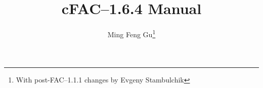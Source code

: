 \documentclass[twoside,a4paper]{refrep}
\newcommand{\cFAC}{{cFAC}\xspace}
\newcommand{\facversion}{{1.6.4}\xspace}
\newcounter{faq}[section]
\newcommand{\+}{\discretionary{\mbox{\scriptsize$\hookleftarrow$}}{}{}}
\begin{document}
\title{\cFAC--\facversion Manual}
\author{Ming Feng Gu\thanks{With post-FAC--1.1.1 changes by Evgeny Stambulchik}}

\date{}

\maketitle

\tableofcontents

















\printindex


\end{document}
